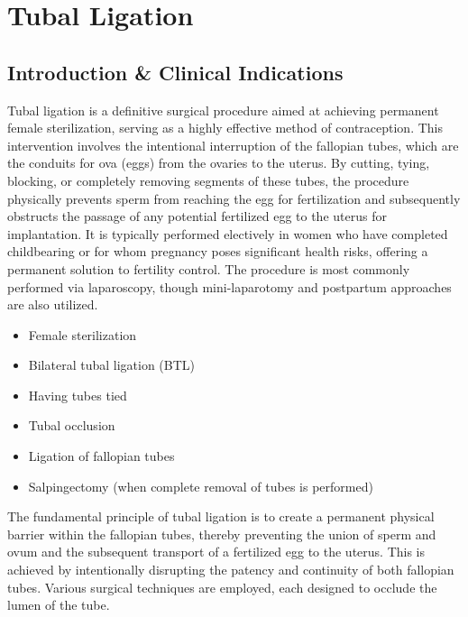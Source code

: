 \chapter{Tubal Ligation}

\section*{Introduction \& Clinical Indications}
Tubal ligation is a definitive surgical procedure aimed at achieving permanent female sterilization, serving as a highly effective method of contraception. This intervention involves the intentional interruption of the fallopian tubes, which are the conduits for ova (eggs) from the ovaries to the uterus. By cutting, tying, blocking, or completely removing segments of these tubes, the procedure physically prevents sperm from reaching the egg for fertilization and subsequently obstructs the passage of any potential fertilized egg to the uterus for implantation. It is typically performed electively in women who have completed childbearing or for whom pregnancy poses significant health risks, offering a permanent solution to fertility control. The procedure is most commonly performed via laparoscopy, though mini-laparotomy and postpartum approaches are also utilized.

\begin{itemize}
  \item Female sterilization
  \item Bilateral tubal ligation (BTL)
  \item Having tubes tied
  \item Tubal occlusion
  \item Ligation of fallopian tubes
  \item Salpingectomy (when complete removal of tubes is performed)
\end{itemize}

The fundamental principle of tubal ligation is to create a permanent physical barrier within the fallopian tubes, thereby preventing the union of sperm and ovum and the subsequent transport of a fertilized egg to the uterus. This is achieved by intentionally disrupting the patency and continuity of both fallopian tubes. Various surgical techniques are employed, each designed to occlude the lumen of the tube. 

